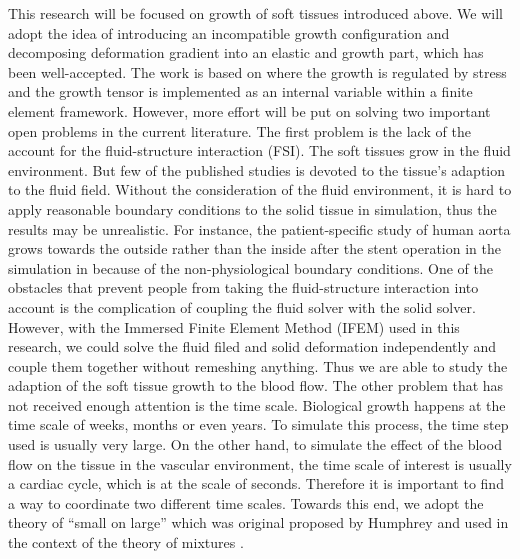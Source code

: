 This research will be focused on growth of soft tissues introduced above. We will adopt the idea of introducing an incompatible growth configuration and decomposing deformation gradient into an elastic and growth part, which has been well-accepted. The work is based on \cite{Himpel, Kuhl3, Goktepe2} where the growth is regulated by stress and the growth tensor is implemented as an internal variable within a finite element framework. However, more effort will be put on solving two important open problems in the current literature. The first problem is the lack of the account for the fluid-structure interaction (FSI). The soft tissues grow in the fluid environment. But few of the published studies is devoted to the tissue's adaption to the fluid field. Without the consideration of the fluid environment, it is hard to apply reasonable boundary conditions to the solid tissue in simulation, thus the results may be unrealistic. For instance, the patient-specific study of human aorta grows towards the outside rather than the inside after the stent operation in the simulation in \cite{Kuhl3} because of the non-physiological boundary conditions. One of the obstacles that prevent people from taking the fluid-structure interaction into account is the complication of coupling the fluid solver with the solid solver. However, with the Immersed Finite Element Method (IFEM) \cite{Lucy4} used in this research, we could solve the fluid filed and solid deformation independently and couple them together without remeshing anything. Thus we are able to study the adaption of the soft tissue growth to the blood flow. The other problem that has not received enough attention is the time scale. Biological growth happens at the time scale of weeks, months or even years. To simulate this process, the time step used is usually very large. On the other hand, to simulate the effect of the blood flow on the tissue in the vascular environment, the time scale of interest is usually a cardiac cycle, which is at the scale of seconds. Therefore it is important to find a way to coordinate two different time scales. Towards this end, we adopt the theory of ``small on large'' which 
was original proposed by Humphrey \cite{Baek} and used in the context of the theory of mixtures \cite{Figueroa}.












